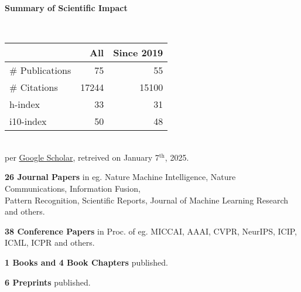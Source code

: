 \headedsection %
{\bf Summary of Scientific Impact}{}{}
{
    \qquad~~~~
    \begin{minipage}[t]{0.6\textwidth}
        \begin{tabular}{lrr}
        \hline
         & All & Since 2019\\
        \hline
        \# Publications & 75     & 55    \\
        \# Citations    & 17244  & 15100 \\
        h-index         & 33     & 31    \\
        i10-index       & 50     & 48    \\
        \hline
    \end{tabular}
    \\
    {\footnotesize{
        per \href{https://scholar.google.com/citations?user=wpLQuroAAAAJ}{Google Scholar},
        retreived on January 7$^\text{th}$, 2025.
        }
    }
    \end{minipage}
    \vstep

    \ifdefined\shortcv
        \vstep
        {\bf 26 Journal Papers} in eg. Nature Machine Intelligence, Nature Communications, Information Fusion,\\
        \hspace*{\fill} Pattern Recognition, Scientific Reports, Journal of Machine Learning Research and others.

        {\bf 38 Conference Papers} in Proc. of eg. MICCAI, AAAI, CVPR, NeurIPS, ICIP, ICML, ICPR and others.

        {\bf 1 Books and 4 Book Chapters} published.

        {\bf 6 Preprints} published.
        
    \else
        {}
    \fi

}
